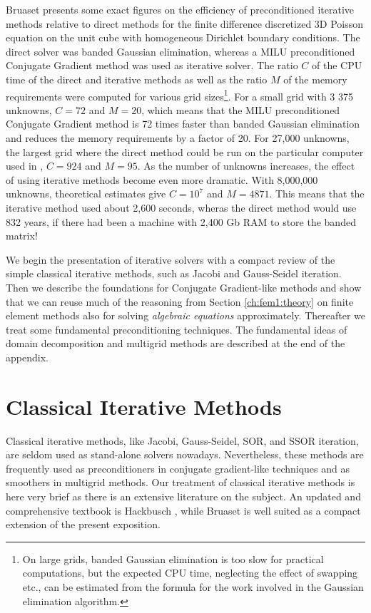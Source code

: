Bruaset \cite{BruBok} presents some exact figures on the efficiency of
preconditioned iterative methods relative to direct methods for the
finite difference discretized 3D Poisson equation on the unit cube
with homogeneous Dirichlet boundary conditions.  The direct solver was
banded Gaussian elimination, whereas a MILU preconditioned Conjugate
Gradient method was used as iterative solver.  The ratio $C$ of the
CPU time of the direct and iterative methods as well as the ratio $M$
of the memory requirements were computed for various grid
sizes\footnote{On large grids, banded Gaussian elimination is too slow
  for practical computations, but the expected CPU time, neglecting
  the effect of swapping etc., can be estimated from the formula for
  the work involved in the Gaussian elimination algorithm.}.  For a
small grid with 3 375 unknowns, $C=72$ and $M=20$, which means that
the MILU preconditioned Conjugate Gradient method is 72 times faster
than banded Gaussian elimination and reduces the memory requirements
by a factor of 20.  For 27,000 unknowns, the largest grid where the
direct method could be run on the particular computer used in
\cite{BruBok}, $C=924$ and $M=95$. As the number of unknowns
increases, the effect of using iterative methods become even more
dramatic.  With 8,000,000 unknowns, theoretical estimates give
$C=10^7$ and $M=4 871$. This means that the iterative method used
about 2,600 seconds, wheras the direct method would use 832 years, if
there had been a machine with 2,400 Gb RAM to store the banded matrix!

We begin the presentation of iterative solvers
with a compact review of the simple classical iterative
methods, such as Jacobi and Gauss-Seidel iteration.
Then we describe the foundations for Conjugate Gradient-like methods
and show that we can reuse much of the reasoning from
Section \ref{ch:fem1:theory} on finite element methods also for
solving \emph{algebraic equations} approximately.
Thereafter we treat some fundamental preconditioning techniques.
The fundamental ideas of domain decomposition and multigrid methods are
described at the end of the appendix.


\section{Classical Iterative Methods}
\label{ch:linalg2:classic}

Classical iterative methods, like Jacobi, Gauss-Seidel, SOR, and SSOR
iteration, are seldom used as stand-alone solvers nowadays. Nevertheless,
these methods are frequently used as preconditioners in
conjugate gradient-like techniques and as smoothers in multigrid methods.
Our treatment of classical iterative methods is here very brief as there is
an extensive literature on the subject. An updated and comprehensive
textbook is Hackbusch \cite{Hackbusch}, while Bruaset
\cite{BruBok} is well suited as
a compact extension of the present exposition.


